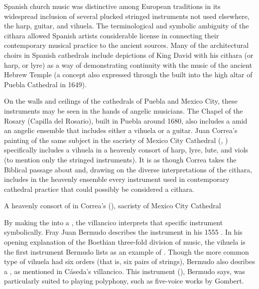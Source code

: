 Spanish church music was distinctive among European traditions in its
widespread inclusion of several plucked stringed instruments not used
elsewhere, the harp, guitar, and vihuela. 
The terminological and symbolic ambiguity of the cithara allowed Spanish
artists considerable license in connecting their contemporary musical practice
to the ancient sources.
Many of the architectural choirs in Spanish cathedrals include depictions of
King David with his cithara (or harp, or lyre) as a way of demonstrating
continuity with the music of the ancient Hebrew Temple (a concept also
expressed through the  built into the high altar of
Puebla Cathedral in 1649).

On the walls and ceilings of the cathedrals of Puebla and Mexico City, these
instruments may be seen in the hands of angelic musicians.
The Chapel of the Rosary (Capilla del Rosario), built in Puebla around 1680,
also includes a  amid an angelic ensemble
that includes either a vihuela or a guitar.
Juan Correa's painting of the same subject in the sacristy of Mexico City
Cathedral (, ) specifically includes a
vihuela in a heavenly consort of harp, lyre, lute, and viols (to mention only
the stringed instruments).
It is as though Correa takes the Biblical passage about  and, drawing on the diverse interpretations of
the cithara, includes in the heavenly ensemble every instrument used in
contemporary cathedral practice that could possibly be considered a cithara.

{A heavenly consort of  in Correa's  (), sacristy of Mexico City Cathedral}

By making the  into a , the villancico interprets
that specific instrument symbolically.
Fray Juan Bermudo describes the instrument in his 1555 .%
    \Autocite{Bermudo:Declaracion}
In his opening explanation of the Boethian three-fold division of music, the
vihuela is the first instrument Bermudo lists as an example of
 .
Though the more common type of vihuela had six orders (that is, six pairs of
strings), Bermudo also desribes a , as
mentioned in Cáseda's villancico.%
    \Autocite[90v--110r]{Bermudo:Declaracion}
This instrument (), Bermudo says, was particularly
suited to playing polyphony, such as five-voice works by Gombert.

